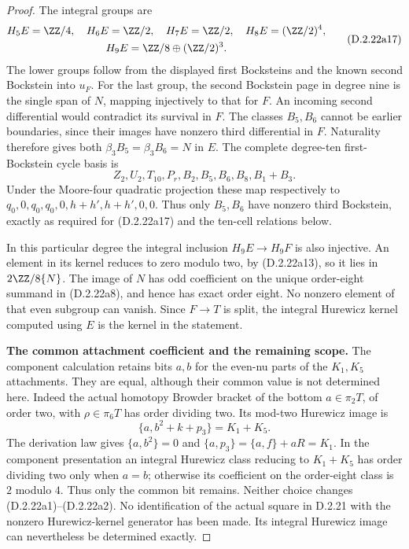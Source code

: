 \begin{proof}
The integral groups are
\[
\begin{gathered}
 H_5E=\ZZ/4,\quad H_6E=\ZZ/2,\quad H_7E=\ZZ/2,
 \quad H_8E=(\ZZ/2)^4,\\
 H_9E=\ZZ/8\oplus(\ZZ/2)^3.
\end{gathered}
\tag{D.2.22a17}
\]
The lower groups follow from the displayed first Bocksteins and
the known second Bockstein into $u_F$.
For the last group, the second Bockstein page in degree nine
is the single span of $N$, mapping injectively to that for $F$.
An incoming second differential would contradict its survival
in $F$. The classes $B_5,B_6$ cannot be earlier boundaries,
since their images have nonzero third differential in $F$.
Naturality therefore gives both
$\beta_3B_5=\beta_3B_6=N$ in $E$.
The complete degree-ten first-Bockstein cycle basis is
\[
 Z_2,U_2,T_{10},P_r,B_2,B_5,B_6,B_8,B_1+B_3.
\]
Under the Moore-four quadratic projection these map respectively
to $q_0,0,q_0,q_0,0,h+h',h+h',0,0$.
Thus only $B_5,B_6$ have nonzero third Bockstein, exactly as
required for \textup{(D.2.22a17)} and the ten-cell relations below.

In this particular degree the integral inclusion $H_9E\to H_9F$
is also injective. An element in its kernel reduces to zero modulo
two, by \textup{(D.2.22a13)}, so it lies in $2\ZZ/8\{N\}$.
The image of $N$ has odd coefficient on the unique order-eight
summand in \textup{(D.2.22a8)}, and hence has exact order eight.
No nonzero element of that even subgroup can vanish. Since
$F\to T$ is split, the integral Hurewicz kernel computed using
$E$ is the kernel in the statement.



\medskip\noindent
\textbf{The common attachment coefficient and the remaining scope.}
The component calculation retains bits $a,b$ for the even-nu
parts of the $K_1,K_5$ attachments. They are equal, although
their common value is not determined here.
Indeed the actual homotopy Browder bracket of the bottom
$a\in\pi_2T$, of order two, with $\rho\in\pi_6T$ has order
dividing two. Its mod-two Hurewicz image is
\[
 \{a,b^2+k+p_3\}=K_1+K_5.
\]
The derivation law gives $\{a,b^2\}=0$ and
$\{a,p_3\}=\{a,f\}+aR=K_1$.
In the component presentation an integral Hurewicz class reducing
to $K_1+K_5$ has order dividing two only when $a=b$;
otherwise its coefficient on the order-eight class is $2$ modulo
$4$. Thus only the common bit remains. Neither choice changes
\textup{(D.2.22a1)--(D.2.22a2)}.
No identification of the actual square in \textup{D.2.21} with
the nonzero Hurewicz-kernel generator has been made. Its integral
Hurewicz image can nevertheless be determined exactly.


\end{proof}
